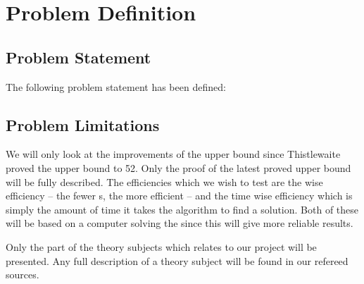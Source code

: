 \chapter{Problem Definition}
\emptyTop{}

\section{Problem Statement}
The following problem statement has been defined:




\section{Problem Limitations}
\label{sec:problemLimitations}
We will only look at the improvements of the upper bound since Thistlewaite proved the upper bound to 52. Only the proof of the latest proved upper bound will be fully described. 
The efficiencies which we wish to test are the \twist{} wise efficiency -- the fewer \twist{}s, the more efficient -- and the time wise efficiency which is simply the amount of time it takes the algorithm to find a solution.
Both of these will be based on a computer solving the \rubik{} since this will give more reliable results.


Only the part of the theory subjects which relates to our project will be presented. Any full description of a theory subject will be found in our refereed sources.